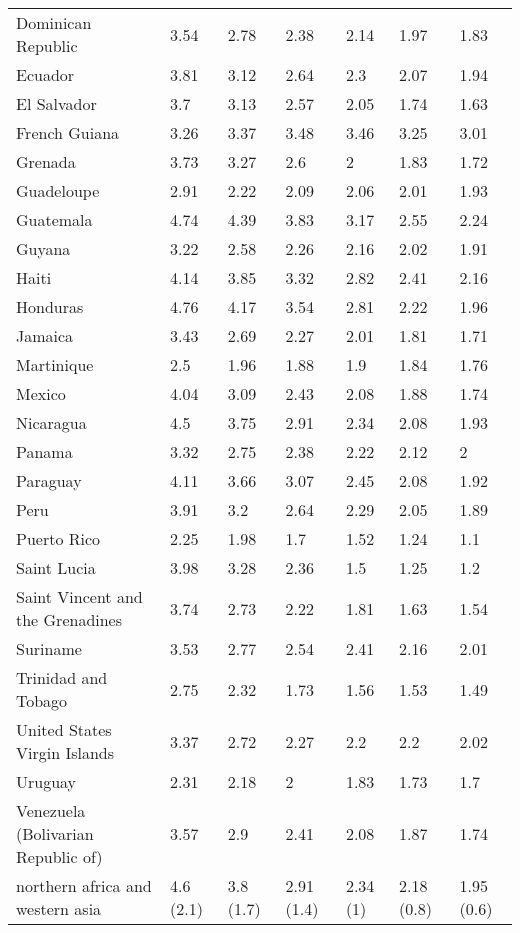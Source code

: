 \begin{longtable}[t]{lllllll}
\addlinespace
Dominican Republic & 3.54 & 2.78 & 2.38 & 2.14 & 1.97 & 1.83\\
Ecuador & 3.81 & 3.12 & 2.64 & 2.3 & 2.07 & 1.94\\
El Salvador & 3.7 & 3.13 & 2.57 & 2.05 & 1.74 & 1.63\\
French Guiana & 3.26 & 3.37 & 3.48 & 3.46 & 3.25 & 3.01\\
Grenada & 3.73 & 3.27 & 2.6 & 2 & 1.83 & 1.72\\
\addlinespace
Guadeloupe & 2.91 & 2.22 & 2.09 & 2.06 & 2.01 & 1.93\\
Guatemala & 4.74 & 4.39 & 3.83 & 3.17 & 2.55 & 2.24\\
Guyana & 3.22 & 2.58 & 2.26 & 2.16 & 2.02 & 1.91\\
Haiti & 4.14 & 3.85 & 3.32 & 2.82 & 2.41 & 2.16\\
Honduras & 4.76 & 4.17 & 3.54 & 2.81 & 2.22 & 1.96\\
\addlinespace
Jamaica & 3.43 & 2.69 & 2.27 & 2.01 & 1.81 & 1.71\\
Martinique & 2.5 & 1.96 & 1.88 & 1.9 & 1.84 & 1.76\\
Mexico & 4.04 & 3.09 & 2.43 & 2.08 & 1.88 & 1.74\\
Nicaragua & 4.5 & 3.75 & 2.91 & 2.34 & 2.08 & 1.93\\
Panama & 3.32 & 2.75 & 2.38 & 2.22 & 2.12 & 2\\
\addlinespace
Paraguay & 4.11 & 3.66 & 3.07 & 2.45 & 2.08 & 1.92\\
Peru & 3.91 & 3.2 & 2.64 & 2.29 & 2.05 & 1.89\\
Puerto Rico & 2.25 & 1.98 & 1.7 & 1.52 & 1.24 & 1.1\\
Saint Lucia & 3.98 & 3.28 & 2.36 & 1.5 & 1.25 & 1.2\\
Saint Vincent and the Grenadines & 3.74 & 2.73 & 2.22 & 1.81 & 1.63 & 1.54\\
\addlinespace
Suriname & 3.53 & 2.77 & 2.54 & 2.41 & 2.16 & 2.01\\
Trinidad and Tobago & 2.75 & 2.32 & 1.73 & 1.56 & 1.53 & 1.49\\
United States Virgin Islands & 3.37 & 2.72 & 2.27 & 2.2 & 2.2 & 2.02\\
Uruguay & 2.31 & 2.18 & 2 & 1.83 & 1.73 & 1.7\\
Venezuela (Bolivarian Republic of) & 3.57 & 2.9 & 2.41 & 2.08 & 1.87 & 1.74\\
\addlinespace
northern africa and western asia & 4.6 (2.1) & 3.8 (1.7) & 2.91 (1.4) & 2.34 (1) & 2.18 (0.8) & 1.95 (0.6)\\

\end{longtable}
